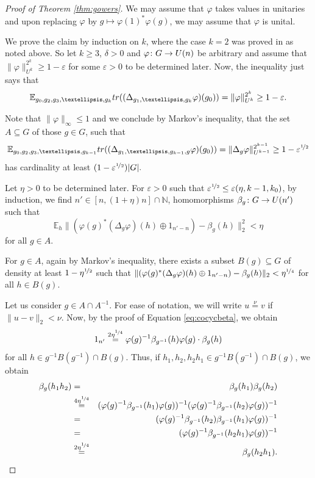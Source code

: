 \documentclass[a4paper,11pt]{amsproc}
\theoremstyle{plain}
\theoremstyle{definition}
\begin{document}
\begin{proof}[Proof of Theorem \ref{thm:gowers}] We may assume that $\varphi$ takes values in unitaries and upon replacing $\varphi$ by $g \mapsto \varphi(1)^{*} \varphi(g)$, we may assume that $\varphi$ is unital.

We prove the claim by induction on $k$, where the case $k=2$ was proved in \cite{MR3733361} as noted above. So let $k \geq 3$, $\delta>0$ and $\varphi \colon G \to {\rm U}(n)$ be arbitrary and assume that $\|\varphi\|^{2^k}_{U^k}  \geq 1 - \varepsilon$ for some $\varepsilon>0$ to be determined later.  Now, the inequality just says that 
$$\mathbb E_{g_0,g_2,g_3,\dots,g_{k}} {\rm tr}((\Delta_{g_1,\dots,g_k}\varphi)(g_{0})) = \|\varphi\|^{2^k}_{U^k}  \geq 1 - \varepsilon.$$

Note that $\|\varphi\|_{\infty} \leq 1$ and we conclude by Markov's inequality, that the set $A \subseteq G$ of those $g \in G$, such that
$$\mathbb E_{g_0,g_2,g_3,\dots,g_{k-1}} {\rm tr}((\Delta_{g_1,\dots,g_{k-1},g}\varphi)(g_{0})) = \|\Delta_{g}\varphi\|^{2^{k-1}}_{U^{k-1}}  \geq 1 - \varepsilon^{\nicefrac12}$$
has cardinality at least $(1- \varepsilon^{\nicefrac12})|G|.$  

Let $\eta>0$ to be determined later. For $\varepsilon>0$ such that $\varepsilon^{\nicefrac12} \leq \varepsilon(\eta,k-1,k_0)$, by induction, we find $n' \in [n,(1+ \eta)n] \cap \mathbb N$, homomorphisms $\beta_g \colon G \to {\rm U}(n')$ such that
$$\mathbb E_h \|(\varphi(g)^*(\Delta_g\varphi)(h) \oplus 1_{n'-n}) - \beta_g(h)\|^2_2 < \eta$$
for all $g \in A.$ 

For $g \in A$, again by Markov's inequality, there exists a subset $B(g) \subseteq G$ of density at least $1-\eta^{\nicefrac12}$ such that $\|(\varphi(g)^*(\Delta_g\varphi)(h) \oplus 1_{n'-n}) - \beta_g(h)\|_2< \eta^{\nicefrac14}$ for all $h \in B(g).$

Let us consider $g \in A \cap A^{-1}$. For ease of notation, we will write $u\stackrel{\nu}{=} v$ if $\|u-v\|_2< \nu.$
Now, by the proof of Equation \eqref{eq:cocycbeta}, we obtain
$$1_{n'} \stackrel{2\eta^{\nicefrac14}}{=} \varphi(g)^{-1} \beta_{g^{-1}}(h) \varphi(g) \cdot \beta_g(h)$$
for all $h \in g^{-1}B(g^{-1}) \cap B(g)$.
Thus, if $h_1,h_2,h_2h_1 \in g^{-1}B(g^{-1}) \cap B(g)$, we obtain
\begin{eqnarray*}
\beta_g(h_1h_2) &=& \beta_g(h_1)\beta_g(h_2) \\
&\stackrel{4\eta^{\nicefrac14}}{=}& (\varphi(g)^{-1} \beta_{g^{-1}}(h_1) \varphi(g))^{-1}(\varphi(g)^{-1} \beta_{g^{-1}}(h_2) \varphi(g))^{-1} \\
&=& (\varphi(g)^{-1} \beta_{g^{-1}}(h_2)\beta_{g^{-1}}(h_1) \varphi(g))^{-1}\\
&=& (\varphi(g)^{-1} \beta_{g^{-1}}(h_2h_1) \varphi(g))^{-1} \\
&\stackrel{2\eta^{\nicefrac14}}{=}& \beta_g(h_2h_1).
\end{eqnarray*}


\end{proof}
\end{document}
